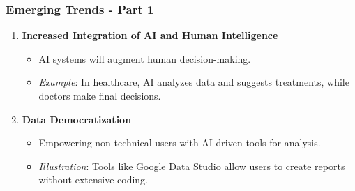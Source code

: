 \documentclass[aspectratio=169]{beamer}
\begin{document}
\begin{frame}[fragile]
    \frametitle{Emerging Trends - Part 1}
    \begin{enumerate}
        \item \textbf{Increased Integration of AI and Human Intelligence}
            \begin{itemize}
                \item AI systems will augment human decision-making.
                \item \textit{Example}: In healthcare, AI analyzes data and suggests treatments, while doctors make final decisions.
            \end{itemize}
        
        \item \textbf{Data Democratization}
            \begin{itemize}
                \item Empowering non-technical users with AI-driven tools for analysis.
                \item \textit{Illustration}: Tools like Google Data Studio allow users to create reports without extensive coding.
            \end{itemize}
    \end{enumerate}
\end{frame}
\end{document}
